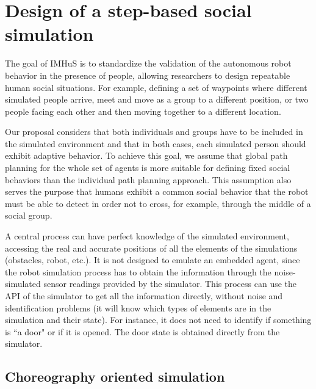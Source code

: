 \section{Design of a step-based social simulation}
\label{sec:design}

The goal of IMHuS is to standardize the validation of the autonomous robot behavior in the presence of people, allowing researchers to design repeatable human social situations. For example, defining a set of waypoints where different simulated people arrive, meet and move as a group to a different position, or two people facing each other and then moving together to a different location.

Our proposal considers that both individuals and groups have to be included in the simulated environment and that in both cases, each simulated person should exhibit adaptive behavior. To achieve this goal, we assume that global path planning for the whole set of agents is more suitable for defining fixed social behaviors than the individual path planning approach. This assumption also serves the purpose that humans exhibit a common social behavior that the robot must be able to detect in order not to cross, for example, through the middle of a social group.

A central process can have perfect knowledge of the simulated environment, accessing the real and accurate positions of all the elements of the simulations (obstacles, robot, etc.). It is not designed to emulate an embedded agent, since the robot simulation process has to obtain the information through the noise-simulated sensor readings provided by the simulator. This process can use the API of the simulator to get all the information directly, without noise and identification problems (it will know which types of elements are in the simulation and their state). For instance, it does not need to identify if something is ``a door" or if it is opened. The door state is obtained directly from the simulator.


\subsection{Choreography oriented simulation}


